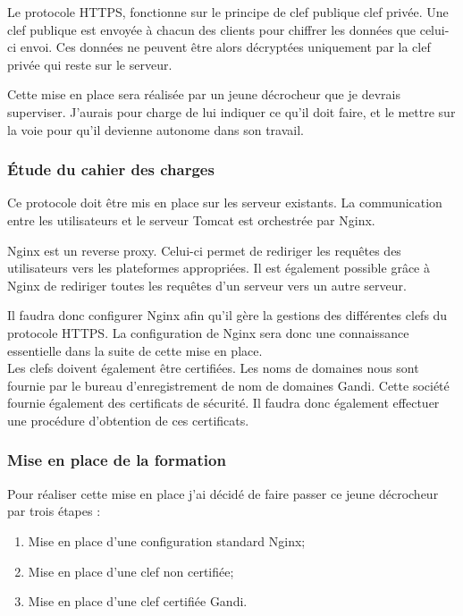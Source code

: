 Le protocole HTTPS, fonctionne sur le principe de clef publique clef privée. Une clef publique est envoyée à chacun des clients pour chiffrer les données que celui-ci envoi. Ces données ne peuvent être alors décryptées uniquement par la clef privée qui reste sur le serveur.

Cette mise en place sera réalisée par un jeune décrocheur que je devrais superviser. J'aurais pour charge de lui indiquer ce qu'il doit faire, et le mettre sur la voie pour qu'il devienne autonome dans son travail.

\subsubsection{Étude du cahier des charges}

Ce protocole doit être mis en place sur les serveur existants. La communication entre les utilisateurs et le serveur Tomcat est orchestrée par Nginx.

Nginx est un reverse proxy. Celui-ci permet de rediriger les requêtes des utilisateurs vers les plateformes appropriées. Il est également possible grâce à Nginx de rediriger toutes les requêtes d'un serveur vers un autre serveur.

Il faudra donc configurer Nginx afin qu'il gère la gestions des différentes clefs du protocole HTTPS. La configuration de Nginx sera donc une connaissance essentielle dans la suite de cette mise en place.\\

Les clefs doivent également être certifiées. Les noms de domaines nous sont fournie par le bureau d'enregistrement de nom de domaines Gandi. Cette société fournie également des certificats de sécurité. Il faudra donc également effectuer une procédure d'obtention de ces certificats.

\subsubsection{Mise en place de la formation}

Pour réaliser cette mise en place j'ai décidé de faire passer ce jeune décrocheur par trois étapes :

\begin{enumerate}
	\item Mise en place d'une configuration standard Nginx;
	\item Mise en place d'une clef non certifiée;
	\item Mise en place d'une clef certifiée Gandi.
\end{enumerate}

